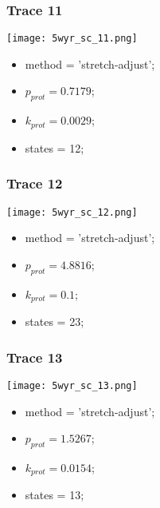\subsubsection{Trace 11}
\begin{minipage}[c]{0.7\textwidth}
    \texttt{[image: 5wyr\_sc\_11.png]}
\end{minipage}
\hfill
\begin{minipage}[c]{0.45\textwidth}
    \begin{itemize}
        \item method = 'stretch-adjust';
        \item $p_{prot}=0.7179$;
        \item $k_{prot}=0.0029$;
        \item states = 12;
    \end{itemize}
\end{minipage}

\subsubsection{Trace 12}
\begin{minipage}[c]{0.7\textwidth}
    \texttt{[image: 5wyr\_sc\_12.png]}
\end{minipage}
\hfill
\begin{minipage}[c]{0.45\textwidth}
    \begin{itemize}
        \item method = 'stretch-adjust';
        \item $p_{prot}=4.8816$;
        \item $k_{prot}=0.1$;
        \item states = 23;
    \end{itemize}
\end{minipage}

\subsubsection{Trace 13}
\begin{minipage}[c]{0.7\textwidth}
    \texttt{[image: 5wyr\_sc\_13.png]}
\end{minipage}
\hfill
\begin{minipage}[c]{0.45\textwidth}
    \begin{itemize}
        \item method = 'stretch-adjust';
        \item $p_{prot}=1.5267$;
        \item $k_{prot}=0.0154$;
        \item states = 13;
    \end{itemize}
\end{minipage}

